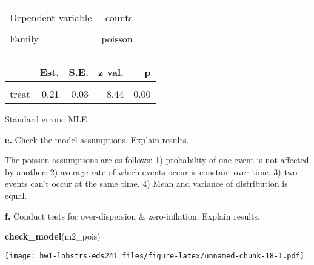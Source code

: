 \documentclass[
]{article}
\newenvironment{Shaded}{\begin{snugshade}}{\end{snugshade}}
\newcommand{\FunctionTok}[1]{\textcolor[rgb]{0.13,0.29,0.53}{\textbf{#1}}}
\newcommand{\NormalTok}[1]{#1}
\begin{document}
\begin{table}[!h]
\centering
\begin{tabular}{lr}
\toprule
\cellcolor{gray!10}{Observations} & \cellcolor{gray!10}{252}\\
Dependent variable & counts\\
\cellcolor{gray!10}{Type} & \cellcolor{gray!10}{Generalized linear model}\\
Family & poisson\\
\cellcolor{gray!10}{Link} & \cellcolor{gray!10}{log}\\
\bottomrule
\end{tabular}
\end{table}  \begin{table}[!h]
\centering
\begin{threeparttable}
\begin{tabular}{lrrrr}
\toprule
  & Est. & S.E. & z val. & p\\
\midrule
\cellcolor{gray!10}{(Intercept)} & \cellcolor{gray!10}{3.12} & \cellcolor{gray!10}{0.02} & \cellcolor{gray!10}{171.74} & \cellcolor{gray!10}{0.00}\\
treat & 0.21 & 0.03 & 8.44 & 0.00\\
\bottomrule
\end{tabular}
\begin{tablenotes}
\item Standard errors: MLE
\end{tablenotes}
\end{threeparttable}
\end{table}

\textbf{e.} Check the model assumptions. Explain results.

The poisson assumptions are as follows: 1) probability of one event is
not affected by another: 2) average rate of which events occur is
constant over time. 3) two events can't occur at the same time. 4) Mean
and variance of distribution is equal.

\textbf{f.} Conduct tests for over-dispersion \& zero-inflation. Explain
results.

\begin{Shaded}
\begin{Highlighting}[]
\FunctionTok{check\_model}\NormalTok{(m2\_pois)}
\end{Highlighting}
\end{Shaded}

\texttt{[image: hw1-lobstrs-eds241\_files/figure-latex/unnamed-chunk-18-1.pdf]}
\end{document}
